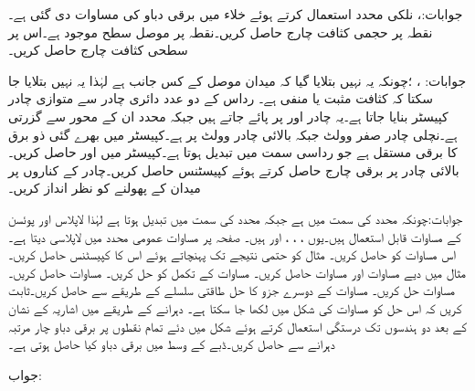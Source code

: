 جوابات:،  
نلکی محدد استعمال کرتے ہوئے خلاء میں برقی دباو کی مساوات  دی گئی ہے۔ نقطہ  پر حجمی کثافت چارج  حاصل کریں۔نقطہ  پر موصل سطح موجود ہے۔اس پر سطحی کثافت چارج  حاصل کریں۔

جوابات: ، ؛چونکہ یہ نہیں بتلایا گیا کہ میدان موصل کے کس جانب ہے لہٰذا یہ نہیں بتلایا جا سکتا کہ کثافت مثبت یا منفی ہے۔
رداس  کے دو عدد دائری چادر سے متوازی چادر کپیسٹر بنایا جاتا ہے۔یہ چادر  اور  پر پائے جاتے ہیں جبکہ  محدد ان کے محور سے گزرتی ہے۔نچلی چادر صفر وولٹ جبکہ بالائی چادر  وولٹ پر ہے۔کپیسٹر میں بھرے گئی ذو برق کا برقی مستقل  ہے جو رداسی سمت میں تبدیل ہوتا ہے۔کپیسٹر میں  اور  حاصل کریں۔بالائی چادر پر برقی چارج حاصل کرتے ہوئے کپیسٹنس حاصل کریں۔چادر کے کناروں پر میدان کے پھولنے کو نظر انداز کریں۔

جوابات:چونکہ   محدد  کی سمت میں ہے جبکہ  محدد  کی سمت میں تبدیل ہوتا ہے لہٰذا لاپلاس اور پوئسن کے مساوات قابل استعمال ہیں۔یوں ،  ، ،  اور  ہیں۔
صفحہ  پر مساوات  عمومی محدد میں لاپلاسی دیتا ہے۔اس مساوات کو حاصل کریں۔
مثال  کو حتمی نتیجے تک پہنچاتے ہوئے اس  کا کپیسٹنس حاصل کریں۔
مثال  میں دیے مساوات  اور مساوات  حاصل کریں۔
مساوات  کے تکمل کو حل کریں۔
مساوات  حاصل کریں۔
مساوات  حل کریں۔
مساوات  کے دوسرے جزو کا حل طاقتی سلسلے کے طریقے سے حاصل کریں۔ثابت کریں کہ اس حل کو مساوات  کی شکل میں لکھا جا سکتا ہے۔
دہرانے کے طریقے میں اشاریہ کے نشان کے بعد دو ہندسوں تک درستگی استعمال کرتے ہوئے شکل  میں دئے تمام نقطوں پر برقی دباو چار مرتبہ دہرانے سے حاصل کریں۔ڈبے کے وسط میں برقی دباو کیا حاصل ہوتی ہے۔

جواب: 
